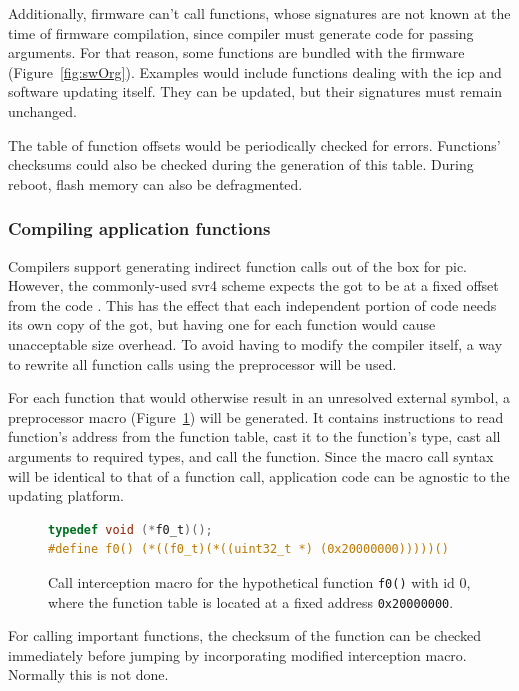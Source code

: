 Additionally, firmware can't call functions, whose signatures are not known at the time of firmware compilation, since compiler must generate code for passing arguments. For that reason, some functions are bundled with the firmware (Figure~\ref{fig:swOrg}). Examples would include functions dealing with the \gls{icp} and software updating itself. They can be updated, but their signatures must remain unchanged.

The table of function offsets would be periodically checked for errors. Functions' checksums could also be checked during the generation of this table. During reboot, flash memory can also be defragmented.

\subsubsection{Compiling application functions}

Compilers support generating indirect function calls out of the box for \gls{pic}. However, the commonly-used \gls{svr4} scheme expects the \gls{got} to be at a fixed offset from the code \cite[Chapter~8]{Levine1999}. This has the effect that each independent portion of code needs its own copy of the \gls{got}, but having one for each function would cause unacceptable size overhead. To avoid having to modify the compiler itself, a way to rewrite all function calls using the preprocessor will be used.

For each function that would otherwise result in an unresolved external symbol, a preprocessor macro (Figure~\ref{fig:macro}) will be generated. It contains instructions to read function's address from the function table, cast it to the function's type, cast all arguments to required types, and call the function. Since the macro call syntax will be identical to that of a function call, application code can be agnostic to the updating platform.

\begin{figure} [htb]
\begin{lstlisting}[language=C]
typedef void (*f0_t)();
#define f0() (*((f0_t)(*((uint32_t *) (0x20000000)))))()
\end{lstlisting}
\caption{Call interception macro for the hypothetical function \texttt{f0()} with id 0, where the function table is located at a fixed address \texttt{0x20000000}.}
\label{fig:macro}
\end{figure}

For calling important functions, the checksum of the function can be checked immediately before jumping by incorporating modified interception macro. Normally this is not done.

